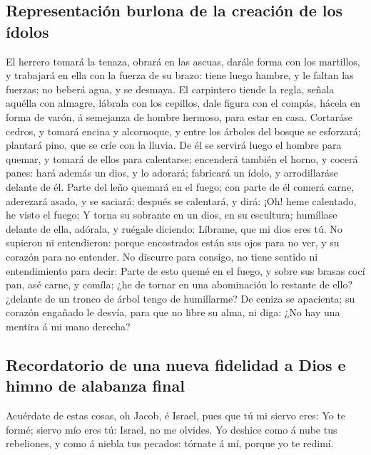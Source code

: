 \hypertarget{representaciuxf3n-burlona-de-la-creaciuxf3n-de-los-uxeddolos}{%
\subsection{Representación burlona de la creación de los
ídolos}\label{representaciuxf3n-burlona-de-la-creaciuxf3n-de-los-uxeddolos}}

 El herrero tomará la tenaza, obrará en las ascuas, darále
forma con los martillos, y trabajará en ella con la fuerza de su brazo:
tiene luego hambre, y le faltan las fuerzas; no beberá agua, y se
desmaya.  El carpintero tiende la regla, señala aquélla con
almagre, lábrala con los cepillos, dale figura con el compás, hácela en
forma de varón, á semejanza de hombre hermoso, para estar en casa.
 Cortaráse cedros, y tomará encina y alcornoque, y entre
los árboles del bosque se esforzará; plantará pino, que se críe con la
lluvia.  De él se servirá luego el hombre para quemar, y
tomará de ellos para calentarse; encenderá también el horno, y cocerá
panes: hará además un dios, y lo adorará; fabricará un ídolo, y
arrodillaráse delante de él.  Parte del leño quemará en el
fuego; con parte de él comerá carne, aderezará asado, y se saciará;
después se calentará, y dirá: ¡Oh! heme calentado, he visto el fuego;
 Y torna su sobrante en un dios, en su escultura; humíllase
delante de ella, adórala, y ruégale diciendo: Líbrame, que mi dios eres
tú.  No supieron ni entendieron: porque encostrados están
sus ojos para no ver, y su corazón para no entender.  No
discurre para consigo, no tiene sentido ni entendimiento para decir:
Parte de esto quemé en el fuego, y sobre sus brasas cocí pan, asé carne,
y comíla; ¿he de tornar en una abominación lo restante de ello? ¿delante
de un tronco de árbol tengo de humillarme?  De ceniza se
apacienta; su corazón engañado le desvía, para que no libre su alma, ni
diga: ¿No hay una mentira á mi mano derecha?

\hypertarget{recordatorio-de-una-nueva-fidelidad-a-dios-e-himno-de-alabanza-final}{%
\subsection{Recordatorio de una nueva fidelidad a Dios e himno de
alabanza
final}\label{recordatorio-de-una-nueva-fidelidad-a-dios-e-himno-de-alabanza-final}}

 Acuérdate de estas cosas, oh Jacob, é Israel, pues que tú
mi siervo eres: Yo te formé; siervo mío eres tú: Israel, no me olvides.
 Yo deshice como á nube tus rebeliones, y como á niebla tus
pecados: tórnate á mí, porque yo te redimí.


